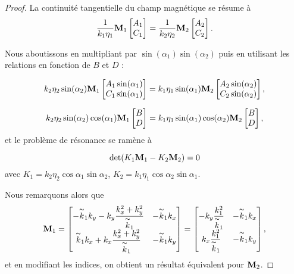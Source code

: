 \begin{proof}
    La continuité tangentielle du champ magnétique se résume à 
    \[
    \dfrac{1}{k_1\eta_1}\mathbf{M}_1\begin{bmatrix}A_1\\C_1\end{bmatrix}=\dfrac{1}{k_2\eta_2}\mathbf{M}_2\begin{bmatrix}A_2\\C_2\end{bmatrix}.
    \]

    Nous aboutissons en multipliant par \(\sin(\alpha_1)\sin(\alpha_2)\) puis en utilisant les relations en fonction de \(B\) et \(D\) :

    \[
    k_2\eta_2\sin(\alpha_2)\mathbf{M}_1\begin{bmatrix}A_1\sin(\alpha_1)\\C_1\sin(\alpha_1)\end{bmatrix}
    =
    k_1\eta_1\sin(\alpha_1)\mathbf{M}_2\begin{bmatrix}A_2\sin(\alpha_2)\\C_2\sin(\alpha_2)\end{bmatrix},
    \]

    \[
    k_2\eta_2\sin(\alpha_2)\cos(\alpha_1)\mathbf{M}_1\begin{bmatrix}B\\D\end{bmatrix}
    =
    k_1\eta_1\sin(\alpha_1)\cos(\alpha_2)\mathbf{M}_2\begin{bmatrix}B\\D\end{bmatrix},
    \]
    et le problème de résonance se ramène à 

    \[
    \operatorname{det}(K_1\mathbf{M}_1-K_2\mathbf{M}_2)=0
    \]
    avec \(K_1=k_2\eta_2\cos \alpha_1\sin \alpha_2\), \(K_2=k_1\eta_1\cos \alpha_2\sin \alpha_1\).

    Nous remarquons alors que
    \[
    \mathbf{M}_1=
    \begin{bmatrix}
    -\overset{\thicksim}{k}_1k_y-k_y\dfrac{k_x^2+k_y^2}{\overset{\thicksim}{k}_1}  &   -\overset{\thicksim}{k}_1k_x
    \\
    \overset{\thicksim}{k}_1k_x+k_x\dfrac{k_x^2+k_y^2}{\overset{\thicksim}{k}_1}   &   -\overset{\thicksim}{k}_1k_y
    \end{bmatrix}
    =
    \begin{bmatrix}
    -k_y\dfrac{k_1^2}{\overset{\thicksim}{k}_1}   &   -\overset{\thicksim}{k}_1k_x
    \\
    k_x\dfrac{k_1^2}{\overset{\thicksim}{k}_1}    &   -\overset{\thicksim}{k}_1k_y
    \end{bmatrix},
    \]
    et en modifiant les indices, on obtient un résultat équivalent pour \(\mathbf{M}_2\).


\end{proof}
